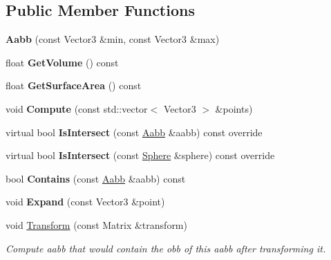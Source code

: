 \subsection*{Public Member Functions}
\begin{DoxyCompactItemize}
\item 
\mbox{\label{classAabb_a03899715c47e17287f251dc325ebd477}} 
{\bfseries Aabb} (const Vector3 \&min, const Vector3 \&max)
\item 
\mbox{\label{classAabb_ad0f21e16f7be2c42839b0cb025eeed9f}} 
float {\bfseries Get\+Volume} () const
\item 
\mbox{\label{classAabb_aa5c6fea4dcb0a7f9640a72b1babfe192}} 
float {\bfseries Get\+Surface\+Area} () const
\item 
\mbox{\label{classAabb_a57f19da16237a3e73ba246bd9a20cb9f}} 
void {\bfseries Compute} (const std\+::vector$<$ Vector3 $>$ \&points)
\item 
\mbox{\label{classAabb_a98746a9bae7409bd1cf3734125b62da6}} 
virtual bool {\bfseries Is\+Intersect} (const \hyperlink{classAabb}{Aabb} \&aabb) const override
\item 
\mbox{\label{classAabb_af08568647c234b68334892b20885084a}} 
virtual bool {\bfseries Is\+Intersect} (const \hyperlink{classSphere}{Sphere} \&sphere) const override
\item 
\mbox{\label{classAabb_ac3cca862f5ccbdf7e3aed736476fd9ea}} 
bool {\bfseries Contains} (const \hyperlink{classAabb}{Aabb} \&aabb) const
\item 
\mbox{\label{classAabb_ac21813c88f72a56e142c984c3efde368}} 
void {\bfseries Expand} (const Vector3 \&point)
\item 
\mbox{\label{classAabb_ace74b981085cccf12e3ff8e8640a0e07}} 
void \hyperlink{classAabb_ace74b981085cccf12e3ff8e8640a0e07}{Transform} (const Matrix \&transform)
\begin{DoxyCompactList}\small\item\em Compute aabb that would contain the obb of this aabb after transforming it. \end{DoxyCompactList}\item 

\end{DoxyCompactItemize}
